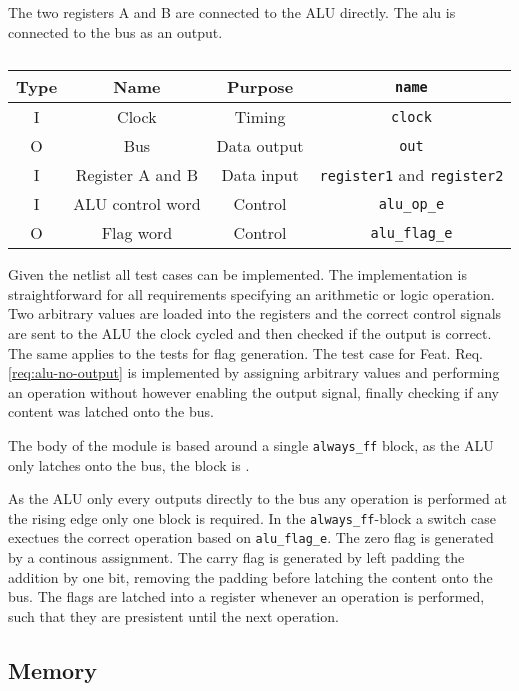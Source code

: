 The two registers A and B are connected to the ALU directly. The alu is connected to the bus as an output. 

\begin{table}[H]
\begin{tabular}{cccc}
  Type& Name & Purpose & \texttt{name}\\ \hline
  I   & Clock & Timing & \texttt{clock}\\
  O   & Bus     & Data output & \texttt{out}        \\
  I   & Register A and B & Data input & \texttt{register1} and \texttt{register2} \\
  I   & ALU control word & Control & \texttt{alu\_op\_e}\\
O   & Flag word & Control & \texttt{alu\_flag\_e}
\end{tabular}
\caption{}
\label{tab:alu-i/o}
\end{table}

Given the netlist all test cases can be implemented. The implementation is straightforward for all requirements specifying an arithmetic or logic operation. Two arbitrary values are loaded into the registers and the correct control signals are sent to the ALU the clock cycled and then checked if the output is correct. The same applies to the tests for flag generation. The test case for Feat. Req. \ref{req:alu-no-output} is implemented by assigning arbitrary values and performing an operation without however enabling the output signal, finally checking if any content was latched onto the bus.  

The body of the module is based around a single \texttt{always\_ff} block, as the ALU only latches onto the bus, the block is \texttt{\@posedge}.

As the ALU only every outputs directly to the bus any operation is performed at the rising edge only one block is required. In the \texttt{always\_ff}-block a switch case exectues the correct operation based on \texttt{alu\_flag\_e}. The zero flag is generated by a continous assignment. The carry flag is generated by left padding the addition by one bit, removing the padding before latching the content onto the bus. The flags are latched into a register whenever an operation is performed, such that they are presistent until the next operation.


% 

\subsection{Memory}

